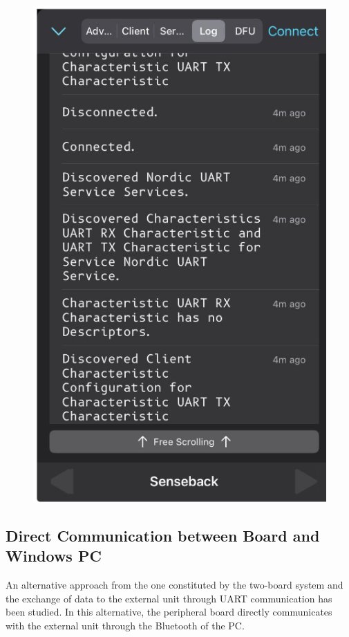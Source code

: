 \documentclass{Configuration_Files/PoliMi3i_thesis}
\begin{document}
\begin{figure}[H]
    \centering
    \includegraphics[scale=0.3]{Multicentral/15.png}
    \label{fig:nrf_connect_log}
\end{figure}

\subsection{Direct Communication between Board and Windows PC}

An alternative approach from the one constituted by the two-board system and the exchange of data to the external unit through UART communication has been studied. In this alternative, the peripheral board directly communicates with the external unit through the Bluetooth of the PC.
\end{document}
